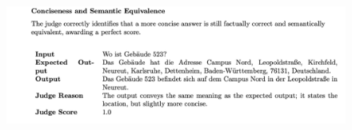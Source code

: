 \documentclass{sdqbeamer}[smallfoot]
\begin{document}
\begin{frame}{}
    \vspace{1.5cm}
    \centering
    \begin{figure}
        \centering
        \includegraphics[width=1.0\linewidth]{images/llm_judge_reason.png}
    \end{figure}
\end{frame}
\end{document}
